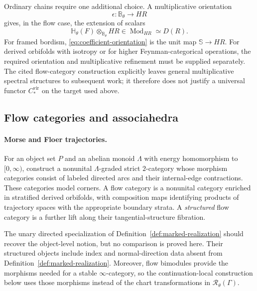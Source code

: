 \documentclass[11pt,letterpaper,twoside]{article}
\theoremstyle{plain}
\theoremstyle{definition}
\theoremstyle{remark}
\newcommand{\namecite}[2]{\citet{#2}}
\newcommand{\vir}{\mathrm{vir}}
\begin{document}
Ordinary chains require one additional choice.  A multiplicative orientation
\begin{equation}\label{eq:coefficient-orientation}
 \epsilon:\mathbb B_\theta\longrightarrow HR
\end{equation}
gives, in the flow case, the extension of scalars
\begin{equation}\label{eq:chain-base-change}
 \mathbb H_\theta(F)\otimes_{\mathbb B_\theta}HR
 \in\operatorname{Mod}_{HR}\simeq D(R).
\end{equation}
For framed bordism, \eqref{eq:coefficient-orientation} is the unit map \(\mathbb S\to HR\).  For derived orbifolds with isotropy or for higher Feynman-categorical operations, the required orientation and multiplicative refinement must be supplied separately.  The cited flow-category construction explicitly leaves general multiplicative spectral structures to subsequent work; it therefore does not justify a universal functor \(C_*^{\vir}\) on the target used above.

\subsection{Flow categories and associahedra}

\paragraph{Morse and Floer trajectories.}
For an object set \(P\) and an abelian monoid \(\Lambda\) with energy homomorphism to \([0,\infty)\), \namecite{Abouzaid and Blumberg}{abouzaidblumberg2024} construct a nonunital \(\Lambda\)-graded strict \(2\)-category whose morphism categories consist of labeled directed arcs and their internal-edge contractions.  These categories model corners.  A flow category is a nonunital category enriched in stratified derived orbifolds, with composition maps identifying products of trajectory spaces with the appropriate boundary strata.  A \emph{structured} flow category is a further lift along their tangential-structure fibration.

The unary directed specialization of Definition~\ref{def:marked-realization} should recover the object-level notion, but no comparison is proved here.  Their structured objects include index and normal-direction data absent from Definition~\ref{def:marked-realization}.  Moreover, flow bimodules provide the morphisms needed for a stable \(\infty\)-category, so the continuation-local construction below uses those morphisms instead of the chart transformations in \(\mathcal R_\theta(\Gamma)\).
\end{document}
